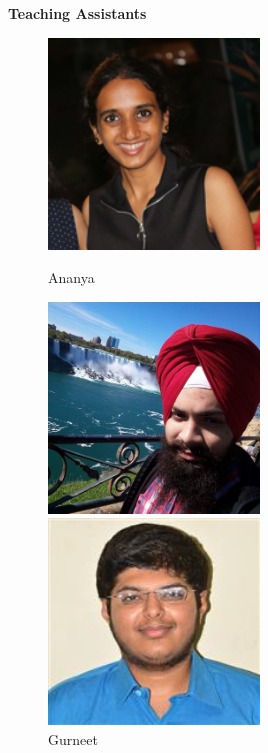 \begin{frame}
    \centering \large{\textbf{Teaching Assistants}}
    \begin{figure}[ht]
        \begin{minipage}[b]{0.23\linewidth}
            \centering
            \includegraphics[width=0.5\textwidth]{ta_images/ananya}
            \caption{Ananya}
            \label{fig:a}
        \end{minipage}
        \begin{minipage}[b]{0.23\linewidth}
            \centering
             \includegraphics[width=0.5\textwidth]{ta_images/gurneet.jpg}
            \caption{Gurneet}
            \label{fig:b}
        \end{minipage}
        \begin{minipage}[b]{0.22\linewidth}
            \centering
            \includegraphics[width=0.5\textwidth]{ta_images/mohan.jpg}

\end{minipage}
\end{figure}
\end{frame}
